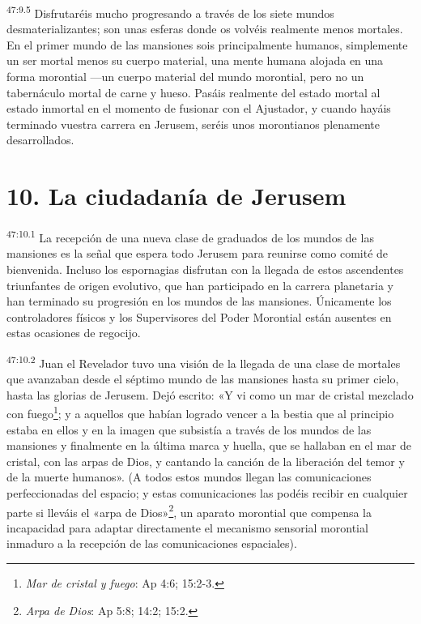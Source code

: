 \par
\textsuperscript{47:9.5} Disfrutaréis mucho progresando a través de los siete mundos desmaterializantes; son unas esferas donde os volvéis realmente menos mortales. En el primer mundo de las mansiones sois principalmente humanos, simplemente un ser mortal menos su cuerpo material, una mente humana alojada en una forma morontial ---un cuerpo material del mundo morontial, pero no un tabernáculo mortal de carne y hueso. Pasáis realmente del estado mortal al estado inmortal en el momento de fusionar con el Ajustador, y cuando hayáis terminado vuestra carrera en Jerusem, seréis unos morontianos plenamente desarrollados.

\section*{10. La ciudadanía de Jerusem}
\par
\textsuperscript{47:10.1} La recepción de una nueva clase de graduados de los mundos de las mansiones es la señal que espera todo Jerusem para reunirse como comité de bienvenida. Incluso los espornagias disfrutan con la llegada de estos ascendentes triunfantes de origen evolutivo, que han participado en la carrera planetaria y han terminado su progresión en los mundos de las mansiones. Únicamente los controladores físicos y los Supervisores del Poder Morontial están ausentes en estas ocasiones de regocijo.

\par
\textsuperscript{47:10.2} Juan el Revelador tuvo una visión de la llegada de una clase de mortales que avanzaban desde el séptimo mundo de las mansiones hasta su primer cielo, hasta las glorias de Jerusem. Dejó escrito: «Y vi como un mar de cristal mezclado con fuego\footnote{\textit{Mar de cristal y fuego}: Ap 4:6; 15:2-3.}; y a aquellos que habían logrado vencer a la bestia que al principio estaba en ellos y en la imagen que subsistía a través de los mundos de las mansiones y finalmente en la última marca y huella, que se hallaban en el mar de cristal, con las arpas de Dios, y cantando la canción de la liberación del temor y de la muerte humanos». (A todos estos mundos llegan las comunicaciones perfeccionadas del espacio; y estas comunicaciones las podéis recibir en cualquier parte si lleváis el «arpa de Dios»\footnote{\textit{Arpa de Dios}: Ap 5:8; 14:2; 15:2.}, un aparato morontial que compensa la incapacidad para adaptar directamente el mecanismo sensorial morontial inmaduro a la recepción de las comunicaciones espaciales).

